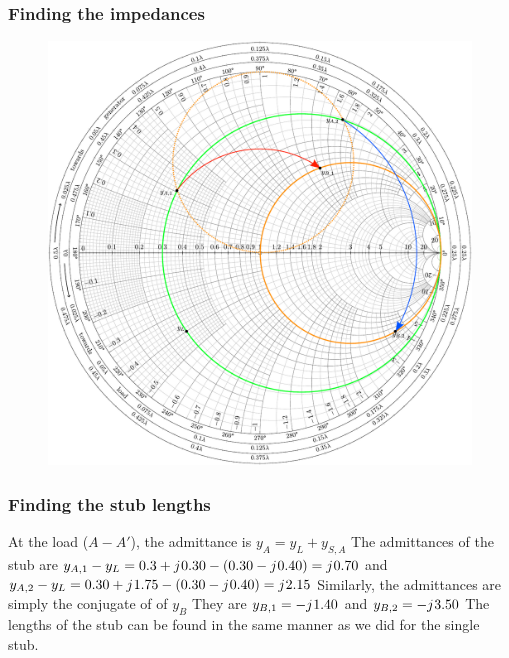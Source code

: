 \documentclass[10pt, compress]{beamer}
\renewcommand{\j}{{j}\mkern1mu} %
\begin{document}
\begin{frame}
    \frametitle{Finding the impedances}
    \begin{figure}[T!]
        \centering
        \includegraphics[width=.7\textwidth]{smith example double stub matching.pdf}
    \end{figure}
\end{frame}

\begin{frame}
    \frametitle{Finding the stub lengths}
    \begin{outline}
        \1 At the load ($A-A'$), the admittance is $y_A = y_L + y_{S,A}$
        \1 The admittances of the stub are $y_{A,1} - y_L  = 0.3 + \j 0.30 - (0.30 - \j 0.40) = \j 0.70$ and $y_{A,2} - y_L = 0.30 + \j 1.75 - (0.30 - \j 0.40) = \j 2.15$
        \1 Similarly, the admittances are simply the conjugate of of $y_B$
        \1 They are $y_{B,1} = -\j 1.40$ and $y_{B,2} = -\j 3.50$
        \1 The lengths of the stub can be found in the same manner as we did for the single stub.
    \end{outline}

    

\end{frame}

\end{document}
